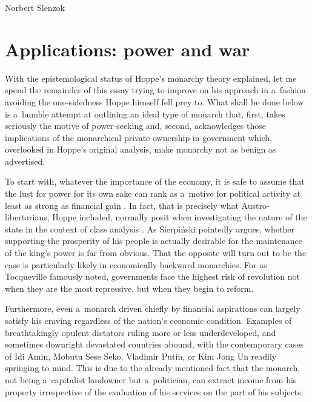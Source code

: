 \begin{artengenv}{Norbert Slenzok}
\section{Applications: power and war}

With the epistemological status of Hoppe's monarchy theory explained, let me spend the remainder of this essay trying to improve on his approach in a~fashion avoiding the one-sidedness Hoppe himself fell prey to. What shall be done below is a~humble attempt at outlining an ideal type of monarch that, first, takes seriously the motive of power-seeking and, second, acknowledges those implications of the monarchical private ownership in government which, overlooked in Hoppe's original analysis, make monarchy not as benign as advertised.



To start with, whatever the importance of the economy, it is safe to assume that the lust for power for its own sake can rank as a~motive for political activity at least as strong as financial gain 
\parencite[][p.272]{nowakowski_dlaczego_2010}. %
 In fact, that is precisely what Austro-libertarians, Hoppe included, normally posit when investigating the nature of the state in the context of class analysis 
\parencites[][pp.117–138]{hoppe_economics_2006}[][pp.55–88]{rothbard_egalitarianism_2000}. %
 As Sierpiński 
\parencite*[][p.557]{sierpinski_critica_2016} %
 pointedly argues, whether supporting the prosperity of his people is actually desirable for the maintenance of the king's power is far from obvious. That the opposite will turn out to be the case is particularly likely in economically backward monarchies. For as Tocqueville 
\parencite*[][]{tocqueville_old_1955} %
 famously noted, governments face the highest risk of revolution not when they are the most repressive, but when they begin to reform.



Furthermore, even a~monarch driven chiefly by financial aspirations can largely satisfy his craving regardless of the nation's economic condition. Examples of breathtakingly opulent dictators ruling more or less underdeveloped, and sometimes downright devastated countries abound, with the contemporary cases of Idi Amin, Mobutu Sese Seko, Vladimir Putin, or Kim Jong Un readily springing to mind. This is due to the already mentioned fact that the monarch, not being a~capitalist landowner but a~politician, can extract income from his property irrespective of the evaluation of his services on the part of his subjects.




\end{artengenv}

